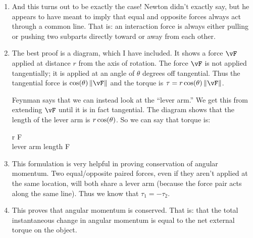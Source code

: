 \begin{enumerate}
  \item And this turns out to be exactly the case! Newton didn't exactly
  say, but he appears to have meant to imply that equal and opposite
  forces always act through a common line. That is: an interaction force
  is always either pulling or pushing two subparts directly toward or
  away from each other.

  \item The best proof is a diagram, which I have included. It shows a
  force $\vF$ applied at distance $r$ from the axis of rotation. The
  force $\vF$ is not applied tangentially; it is applied at an angle of
  $\theta$ degrees off tangential. Thus the tangential force is
  $\cosf{\theta} \norm{\vF}$ and the torque is $\tau = r \cosf{\theta}
  \norm{\vF}$.

  Feynman says that we can instead look at the ``lever arm.'' We get
  this from extending $\vF$ until it is in fact tangential. The diagram
  shows that the length of the lever arm is $r \cos\mathopen{}\left( {\theta} \right)\mathclose{}$. So we can
  say that torque is:

  \begin{nedqn}
    \tau
  \eqcol
    r \cosf{\theta} F
  \\
  \eqcol
    \textrm{lever arm length} \cdot F
  \end{nedqn}

  \item This formulation is very helpful in proving conservation of
  angular momentum. Two equal/opposite paired forces, even if they
  aren't applied at the same location, will both share a lever arm
  (because the force pair acts along the same line). Thus we know that
  $\tau_1 = -\tau_2$.

  \item This proves that angular momentum is conserved. That is: that
  the total instantaneous change in angular momentum is equal to the net
  external torque on the object.
\end{enumerate}
